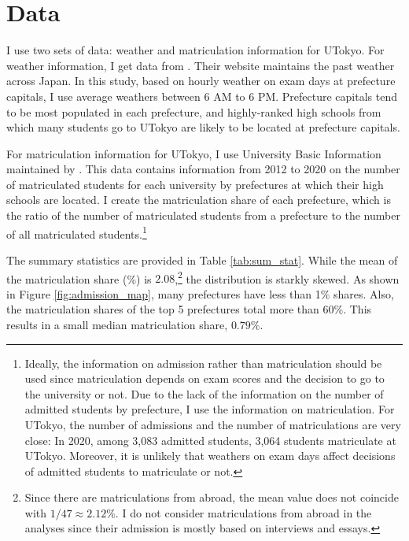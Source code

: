 \documentclass[12pt,letterpaper]{article}
\begin{document}
\section{Data}\label{sec:data}

I use two sets of data: weather and matriculation information for UTokyo.
For weather information, I get data from .
Their website maintains the past weather across Japan.
In this study, based on hourly weather on exam days at prefecture capitals, I use average weathers between 6 AM to 6 PM.
Prefecture capitals tend to be most populated in each prefecture, and highly-ranked high schools from which many students go to UTokyo are likely to be located at prefecture capitals.

For matriculation information for UTokyo, I use University Basic Information maintained by .
This data contains information from 2012 to 2020 on the number of matriculated students for each university by prefectures at which their high schools are located.
I create the matriculation share of each prefecture, which is the ratio of the number of matriculated students from a prefecture to the number of all matriculated students.\footnote{
  Ideally, the information on admission rather than matriculation should be used since matriculation depends on exam scores and the decision to go to the university or not.
  Due to the lack of the information on the number of admitted students by prefecture, I use the information on matriculation.
  For UTokyo, the number of admissions and the number of matriculations are very close:
  In 2020, among 3,083 admitted students, 3,064 students matriculate at UTokyo.
  Moreover, it is unlikely that weathers on exam days affect decisions of admitted students to matriculate or not.
}

The summary statistics are provided in Table \ref{tab:sum_stat}.
While the mean of the matriculation share (\%) is $2.08$,\footnote{
  Since there are matriculations from abroad, the mean value does not coincide with $1 / 47 \approx 2.12\%$.
  I do not consider matriculations from abroad in the analyses since their admission is mostly based on interviews and essays.
} the distribution is starkly skewed.
As shown in Figure \ref{fig:admission_map}, many prefectures have less than 1\% shares.
Also, the matriculation shares of the top 5 prefectures total more than 60\%.
This results in a small median matriculation share, $0.79 \%$.
\end{document}
